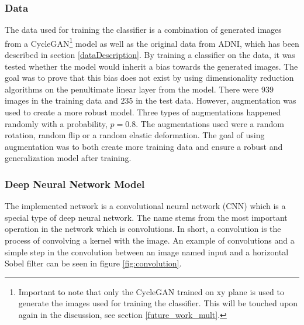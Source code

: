 \documentclass[11pt, fleqn, titlepage]{article}
\newcommand{\1}[1]{\mathds{1}\left[#1\right]}
\begin{document}
\subsubsection{Data}
The data used for training the classifier is a combination of generated images from a CycleGAN\footnote{Important to note that only the CycleGAN trained on xy plane is used to generate the images used for training the classifier. This will be touched upon again in the discussion, see section \ref{future_work_mult}.} model as well as the original data from ADNI, which has been described in section \ref{dataDescription}. By training a classifier on the data, it was tested whether the model would inherit a bias towards the generated images. The goal was to prove that this bias does not exist by using dimensionality reduction algorithms on the penultimate linear layer from the model. There were 939 images in the training data and 235 in the test data. However, augmentation was used to create a more robust model. Three types of augmentations happened randomly with a probability, $ p = 0.8 $. The augmentations used were a random rotation, random flip or a random elastic deformation. The goal of using augmentation was to both create more training data and ensure a robust and generalization model after training. 

\subsubsection{Deep Neural Network Model}

	The implemented network is a convolutional neural network (CNN) which is a special type of deep neural network. The name stems from the most important operation in the network which is convolutions. In short, a convolution is the process of convolving a kernel with the image. An example of convolutions and a simple step in the convolution between an image named input and a horizontal Sobel filter can be seen in figure \ref{fig:convolution}.
	
\end{document}
